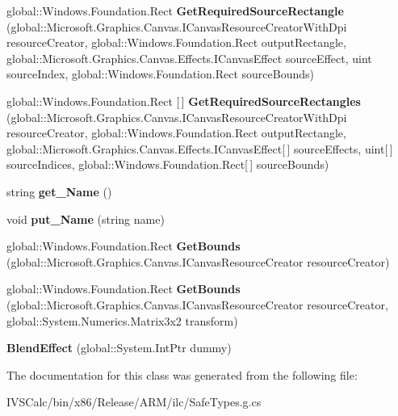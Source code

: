\begin{DoxyCompactItemize}
global\+::\+Windows.\+Foundation.\+Rect {\bfseries Get\+Required\+Source\+Rectangle} (global\+::\+Microsoft.\+Graphics.\+Canvas.\+I\+Canvas\+Resource\+Creator\+With\+Dpi resource\+Creator, global\+::\+Windows.\+Foundation.\+Rect output\+Rectangle, global\+::\+Microsoft.\+Graphics.\+Canvas.\+Effects.\+I\+Canvas\+Effect source\+Effect, uint source\+Index, global\+::\+Windows.\+Foundation.\+Rect source\+Bounds)
\item 
\mbox{\label{class_microsoft_1_1_graphics_1_1_canvas_1_1_effects_1_1_blend_effect_ab569b0bbd75fda084b9b5bdaa67e0435}} 
global\+::\+Windows.\+Foundation.\+Rect \mbox{[}$\,$\mbox{]} {\bfseries Get\+Required\+Source\+Rectangles} (global\+::\+Microsoft.\+Graphics.\+Canvas.\+I\+Canvas\+Resource\+Creator\+With\+Dpi resource\+Creator, global\+::\+Windows.\+Foundation.\+Rect output\+Rectangle, global\+::\+Microsoft.\+Graphics.\+Canvas.\+Effects.\+I\+Canvas\+Effect\mbox{[}$\,$\mbox{]} source\+Effects, uint\mbox{[}$\,$\mbox{]} source\+Indices, global\+::\+Windows.\+Foundation.\+Rect\mbox{[}$\,$\mbox{]} source\+Bounds)
\item 
\mbox{\label{class_microsoft_1_1_graphics_1_1_canvas_1_1_effects_1_1_blend_effect_ae6a348ba6554e025e0079757f11fc876}} 
string {\bfseries get\+\_\+\+Name} ()
\item 
\mbox{\label{class_microsoft_1_1_graphics_1_1_canvas_1_1_effects_1_1_blend_effect_a1a62a28a8ed5733d966ad494c3936511}} 
void {\bfseries put\+\_\+\+Name} (string name)
\item 
\mbox{\label{class_microsoft_1_1_graphics_1_1_canvas_1_1_effects_1_1_blend_effect_a7a22f733debb5fcc64e20a7ef9d6c633}} 
global\+::\+Windows.\+Foundation.\+Rect {\bfseries Get\+Bounds} (global\+::\+Microsoft.\+Graphics.\+Canvas.\+I\+Canvas\+Resource\+Creator resource\+Creator)
\item 
\mbox{\label{class_microsoft_1_1_graphics_1_1_canvas_1_1_effects_1_1_blend_effect_aeaac7a44c02206f0c747d639ddf8c73a}} 
global\+::\+Windows.\+Foundation.\+Rect {\bfseries Get\+Bounds} (global\+::\+Microsoft.\+Graphics.\+Canvas.\+I\+Canvas\+Resource\+Creator resource\+Creator, global\+::\+System.\+Numerics.\+Matrix3x2 transform)
\item 
\mbox{\label{class_microsoft_1_1_graphics_1_1_canvas_1_1_effects_1_1_blend_effect_aacace451098126cd26608dce234e9905}} 
{\bfseries Blend\+Effect} (global\+::\+System.\+Int\+Ptr dummy)
\end{DoxyCompactItemize}


The documentation for this class was generated from the following file\+:\begin{DoxyCompactItemize}
\item 
I\+V\+S\+Calc/bin/x86/\+Release/\+A\+R\+M/ilc/Safe\+Types.\+g.\+cs\end{DoxyCompactItemize}

